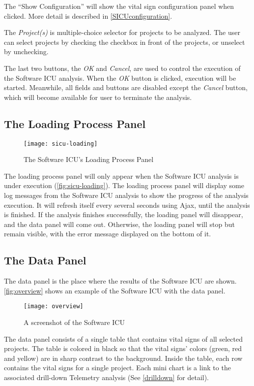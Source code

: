 The ``Show Configuration'' will show the vital sign configuration panel when clicked. More detail is described in \autoref{SICUconfiguration}.

The {\it Project(s)} is multiple-choice selector for projects to be analyzed. The user can select projects by checking the checkbox in front of the projects, or unselect by unchecking. 

The last two buttons, the {\it OK} and {\it Cancel}, are used to control the execution of the Software ICU analysis. When the {\it OK} button is clicked, execution will be started. Meanwhile, all fields and buttons are disabled except the {\it Cancel} button, which will become available for user to terminate the analysis. 

\subsection{The Loading Process Panel}
\begin{figure}[htbp]
   \centering
   \texttt{[image: sicu-loading]}
   \caption{The Software ICU's Loading Process Panel}
   \label{fig:sicu-loading}
\end{figure}
The loading process panel will only appear when the Software ICU analysis is under execution (\autoref{fig:sicu-loading}). The loading process panel will display some log messages from the Software ICU analysis to show the progress of the analysis execution. It will refresh itself every several seconds using Ajax, until the analysis is finished. If the analysis finishes successfully, the loading panel will disappear, and the data panel will come out. Otherwise, the loading panel will stop but remain visible, with the error message displayed on the bottom of it.

\subsection{The Data Panel}
The data panel is the place where the results of the Software ICU are shown. \autoref{fig:overview} shows an example of the Software ICU with the data panel. 

\begin{figure}[htbp]
   \centering
   \texttt{[image: overview]}
   \caption{A screenshot of the Software ICU}
   \label{fig:overview}
\end{figure}

The data panel consists of a single table that contains vital signs of all selected projects. The table is colored in black so that the vital signs' colors (green, red and yellow) are in sharp contrast to the background. Inside the table, each row contains the vital signs for a single project. Each mini chart is a link to the associated drill-down Telemetry analysis (See \autoref{drilldown} for detail).

